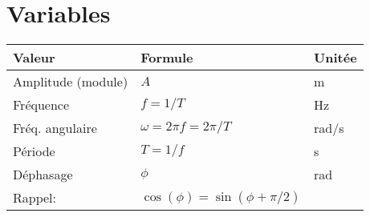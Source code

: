 \section{Variables}
\vspace{-2em}
\begin{tabular}{lll}
    Valeur & Formule & Unitée\\\hline
    Amplitude (module) & $A$ & m\\
    Fréquence & $f = 1/T$ & Hz\\
    Fréq. angulaire & $\omega = 2\pi f = 2\pi/T$ & rad/s\\
    Période & $T=1/f$ & s\\
    Déphasage & $\phi$ & rad\\
    \hfill Rappel: & $\cos(\phi)=\sin(\phi + \pi/2)$ & 
\end{tabular}